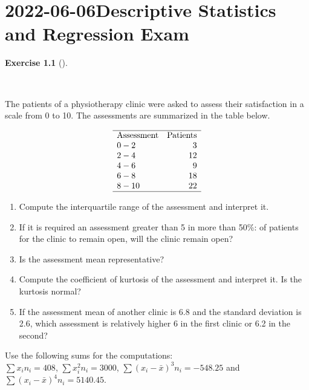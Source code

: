 \documentclass[
  a4paper,
]{scrreport}
\theoremstyle{definition}
\newtheorem{exercise}{Exercise}[chapter]
\theoremstyle{remark}
\begin{document}

\hypertarget{descriptive-statistics-and-regression-exam-1}{%
\chapter{\texorpdfstring{2022-06-06Descriptive Statistics and Regression
Exam}{2022-06-06 Descriptive Statistics and Regression Exam}}\label{descriptive-statistics-and-regression-exam-1}}

\begin{exercise}[]\protect\hypertarget{exr-1}{}\label{exr-1}

~

The patients of a physiotherapy clinic were asked to assess their
satisfaction in a scale from 0 to 10. The assessments are summarized in
the table below.

\[
\begin{array}{lr} 
\hline
\mbox{Assessment} & \mbox{Patients}\\  
0 - 2 & 3\\
2 - 4 & 12\\  
4 - 6 & 9\\ 
6 - 8 & 18\\ 
8 - 10 & 22\\ 
\hline
\end{array}
\]

\begin{enumerate}
\def\labelenumi{\alph{enumi}.}
\item
  Compute the interquartile range of the assessment and interpret it.
\item
  If it is required an assessment greater than 5 in more than 50\%: of
  patients for the clinic to remain open, will the clinic remain open?
\item
  Is the assessment mean representative?
\item
  Compute the coefficient of kurtosis of the assessment and interpret
  it. Is the kurtosis normal?
\item
  If the assessment mean of another clinic is 6.8 and the standard
  deviation is 2.6, which assessment is relatively higher 6 in the first
  clinic or 6.2 in the second?
\end{enumerate}

Use the following sums for the computations:\\
\(\sum x_in_i=408\), \(\sum x_i^2n_i=3000\),
\(\sum (x_i-\bar x)^3n_i=-548.25\) and
\(\sum (x_i-\bar x)^4n_i=5140.45\).


\end{exercise}
\end{document}
